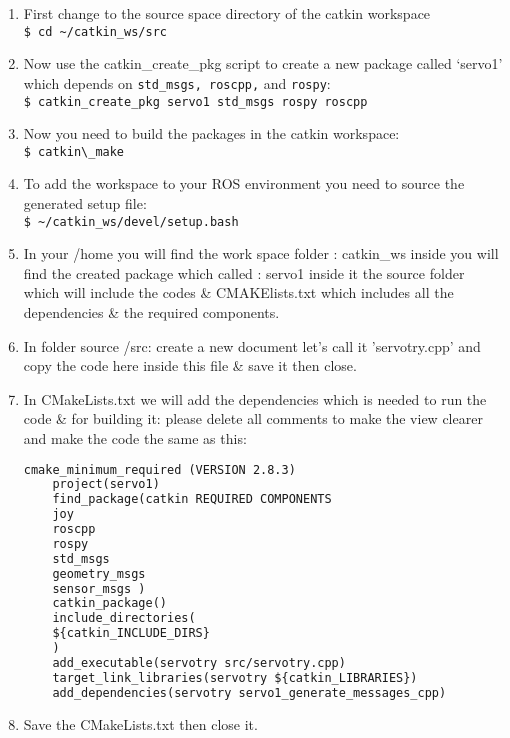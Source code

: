  \begin{enumerate}
 	\item First change to the source space directory of the catkin workspace\\
      \lstinline|$ cd ~/catkin_ws/src|
     
     
 	\item Now use the catkin\_create\_pkg script to create a new package called ‘servo1’ which depends on \verb|std_msgs, roscpp,| and \verb|rospy|:\\
     \lstinline|$ catkin_create_pkg servo1 std_msgs rospy roscpp|
     
 	\item Now you need to build the packages in the catkin workspace:\\
    \lstinline|$ catkin\_make|
     
 	\item To add the workspace to your ROS environment you need to source the generated setup file:\\
         \lstinline|$ ~/catkin_ws/devel/setup.bash|
         
 	\item In your /home you will find the work space folder : catkin\_ws inside you will find the created package which called : servo1 inside it the source folder which will include the codes \& CMAKElists.txt which includes all the dependencies \& the required components.
     
 	\item In folder source /src: create a new document let's call it 'servotry.cpp' and copy the code here inside this file \& save it then close.
     
 	\item In CMakeLists.txt we will add the dependencies which is needed to run the code \& for building it: please delete all comments to make the view clearer and make the code the same as this:
 	\begin{lstlisting}[language=XML]
 	cmake_minimum_required (VERSION 2.8.3) 
 	project(servo1)
 	find_package(catkin REQUIRED COMPONENTS
 	joy
 	roscpp
 	rospy
 	std_msgs
 	geometry_msgs
 	sensor_msgs )
 	catkin_package()
 	include_directories(
 	${catkin_INCLUDE_DIRS}
 	)
 	add_executable(servotry src/servotry.cpp)
 	target_link_libraries(servotry ${catkin_LIBRARIES})
 	add_dependencies(servotry servo1_generate_messages_cpp)
 \end{lstlisting}
     \item Save the CMakeLists.txt then close it.
 	

\end{enumerate}
